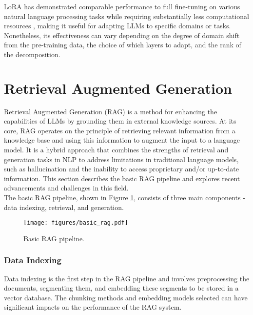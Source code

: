LoRA has demonstrated comparable performance to full fine-tuning on various natural language processing tasks while requiring substantially less computational resources \cite{hu2021loralowrankadaptationlarge}, making it useful for adapting LLMs to specific domains or tasks. Nonetheless, its effectiveness can vary depending on the degree of domain shift from the pre-training data, the choice of which layers to adapt, and the rank of the decomposition.


\section{Retrieval Augmented Generation}

Retrieval Augmented Generation (RAG) \cite{lewis2021retrievalaugmented} is a method for enhancing the capabilities of LLMs by grounding them in external knowledge sources. At its core, RAG operates on the principle of retrieving relevant information from a knowledge base and using this information to augment the input to a language model. It is a hybrid approach that combines the strengths of retrieval and generation tasks in NLP to address limitations in traditional language models, such as hallucination and the inability to access proprietary and/or up-to-date information. This section describes the basic RAG pipeline and explores recent advancements and challenges in this field.\\


The basic RAG pipeline, shown in Figure \ref{fig:basic_rag}, consists of three main components - data indexing, retrieval, and generation. 



\begin{figure}[H]
    \centering
    \texttt{[image: figures/basic\_rag.pdf]}
    \caption{Basic RAG pipeline.}
    \label{fig:basic_rag}
\end{figure}


\subsubsection{Data Indexing}

Data indexing is the first step in the RAG pipeline and involves preprocessing the documents, segmenting them, and embedding these segments to be stored in a vector database. The chunking methods and embedding models selected can have significant impacts on the performance of the RAG system.\\

